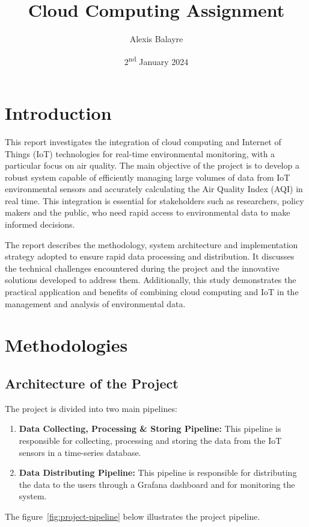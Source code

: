 \documentclass[12pt,oneside]{book} %
\title{Cloud Computing Assignment}
\author{Alexis Balayre}
\date{2\textsuperscript{nd} January 2024}
\begin{document}
\frontmatter

\maketitle

{
    \clearpage
    \singlespacing
    {
        \tableofcontents
    }
    \clearpage

    \listoffigures

    \listoftables
}

\mainmatter
\pagestyle{fancy}
\fancyhead[L]{\nouppercase{\leftmark}}
\fancyhead[R]{\nouppercase{\rightmark}}

\chapter{Introduction}
This report investigates the integration of cloud computing and Internet of
Things (IoT) technologies for real-time environmental monitoring, with a
particular focus on air quality. The main objective of the project is to
develop a robust system capable of efficiently managing large volumes of data
from IoT environmental sensors and accurately calculating the Air Quality Index
(AQI) in real time. This integration is essential for stakeholders such as
researchers, policy makers and the public, who need rapid access to
environmental data to make informed decisions.

The report describes the methodology, system architecture and implementation
strategy adopted to ensure rapid data processing and distribution. It discusses
the technical challenges encountered during the project and the innovative
solutions developed to address them. Additionally, this study demonstrates the
practical application and benefits of combining cloud computing and IoT in the
management and analysis of environmental data.

\chapter{Methodologies}\label{chap:one}

\section{Architecture of the Project}
The project is divided into two main pipelines:
\begin{enumerate}
    \item \textbf{Data Collecting, Processing \& Storing Pipeline:} This pipeline is responsible for collecting, processing and storing the data from the IoT sensors in a time-series database.
    \item \textbf{Data Distributing Pipeline:} This pipeline is responsible for distributing the data to the users through a Grafana dashboard and for monitoring the system.
\end{enumerate}
The figure~\ref{fig:project-pipeline} below illustrates the project pipeline.
\end{document}

